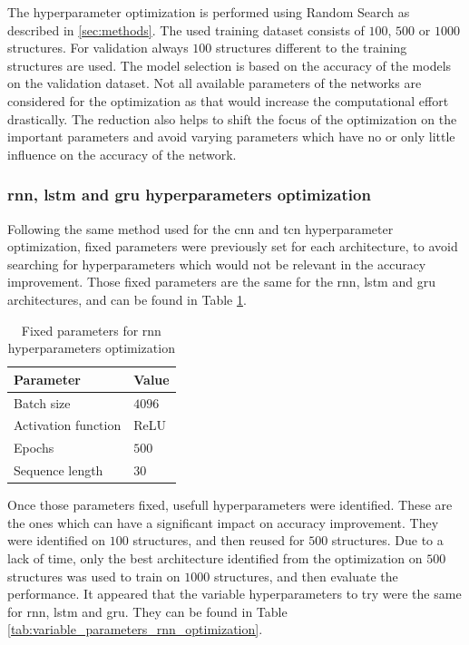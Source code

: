\documentclass[conference]{IEEEtran}
\begin{document}
The hyperparameter optimization is performed using Random Search as described in \ref{sec:methods}. The used training dataset consists of $ 100 $, $ 500 $ or $ 1000 $ structures. For validation always $ 100 $ structures different to the training structures are used. The model selection is based on the accuracy of the models on the validation dataset. Not all available parameters of the networks are considered for the optimization as that would increase the computational effort drastically. The reduction also helps to shift the focus of the optimization on the important parameters and avoid varying parameters which have no or only little influence on the accuracy of the network.

\subsubsection{\gls{rnn}, \gls{lstm} and \gls{gru} hyperparameters optimization}

Following the same method used for the \gls{cnn} and \gls{tcn} hyperparameter optimization, fixed parameters were previously set for each architecture, to avoid searching for hyperparameters which would not be relevant in the accuracy improvement. Those fixed parameters are the same for the \gls{rnn}, \gls{lstm} and \gls{gru} architectures, and can be found in Table \ref{tab:fixed_parameters_rnn_optimization}.


\begin{table}[htp]
	\centering
	\caption{Fixed parameters for \gls{rnn} hyperparameters optimization}
	\label{tab:fixed_parameters_rnn_optimization}
	\begin{tabular}{ll}
		\textbf{Parameter} & \textbf{Value} \\
		\hline
		Batch size & $ 4096 $ \\
		Activation function & ReLU \\
		Epochs & $ 500 $ \\
		Sequence length & $ 30 $ 
	\end{tabular}
\end{table}


Once those parameters fixed, usefull hyperparameters were identified. These are the ones which can have a significant impact on accuracy improvement. They were identified on $ 100 $ structures, and then reused for $ 500 $ structures. Due to a lack of time, only the best architecture identified from the optimization on $ 500 $ structures was used to train on $ 1000 $ structures, and then evaluate the performance. It appeared that the variable hyperparameters to try were the same for \gls{rnn}, \gls{lstm} and \gls{gru}. They can be found in Table \ref{tab:variable_parameters_rnn_optimization}.
\end{document}

